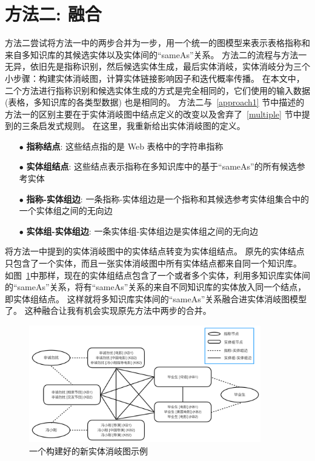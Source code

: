 \section{方法二: 融合}\label{approach2}
方法二尝试将方法一中的两步合并为一步，用一个统一的图模型来表示表格指称和来自多知识库的其候选实体以及实体间的``sameAs''关系。
方法二的流程与方法一无异，依旧先是指称识别，然后候选实体生成，最后实体消岐，实体消岐分为三个小步骤：构建实体消岐图，计算实体链接影响因子和迭代概率传播。
在本文中，二个方法进行指称识别和候选实体生成的方式是完全相同的，它们使用的输入数据 (表格，多知识库的各类型数据) 也是相同的。
方法二与~\ref{approach1} 节中描述的方法一的区别主要在于实体消岐图中结点定义的改变以及舍弃了~\ref{multiple} 节中提到的三条启发式规则。
在这里，我重新给出实体消岐图的定义。
\begin{itemize}
  \item[$\bullet$] \textbf{指称结点}: 这些结点指的是 Web 表格中的字符串指称
  \item[$\bullet$] \textbf{实体组结点}: 这些结点表示指称在多知识库中的基于``sameAs''的所有候选参考实体
  \item[$\bullet$] \textbf{指称-实体组边}: 一条指称-实体组边是一个指称和其候选参考实体组集合中的一个实体组之间的无向边
  \item[$\bullet$] \textbf{实体组-实体组边}: 一条实体组-实体组边是实体组之间的无向边
\end{itemize}
将方法一中提到的实体消岐图中的实体结点转变为实体组结点。
原先的实体结点只包含了一个实体，而且一张实体消岐图中所有实体结点都来自同一个知识库。
如图~\ref{edg2}中那样，现在的实体组结点包含了一个或者多个实体，利用多知识库实体间的``sameAs''关系，将有``sameAs''关系的来自不同知识库的实体放入同一个结点，即实体组结点。
这样就将多知识库实体间的``sameAs''关系融合进实体消岐图模型了。
这种融合让我有机会实现原先方法中两步的合并。

\begin{figure}[htbp]
\centering
\includegraphics[width=0.9\textwidth]{img/edg2}
\caption{一个构建好的新实体消岐图示例}
\label{edg2}
\end{figure}

